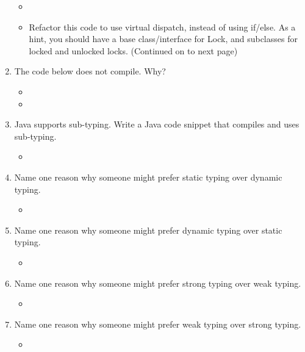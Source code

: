 \documentclass[12pt,a4paper]{article}
\begin{document}
\begin{enumerate}
\begin{itemize}
      \item[] 
      \item[] Refactor this code to use virtual dispatch, instead of using if/else. As a hint, you should have a
      base class/interface for Lock, and subclasses for locked and unlocked locks. (Continued on to
      next page) 
    \end{itemize}
    \clearpage
    \item The code below does not compile. Why? %
    \begin{itemize}
      \item[] 
      \item[] 
    \end{itemize}
    \clearpage
    \item Java supports sub-typing. Write a Java code snippet that compiles and uses sub-typing. %
    \begin{itemize}
      \item 
    \end{itemize} 
    \item Name one reason why someone might prefer static typing over dynamic typing. %
    \begin{itemize}
      \item 
    \end{itemize}
    \item Name one reason why someone might prefer dynamic typing over static typing. %
    \begin{itemize}
      \item 
    \end{itemize}
    \item Name one reason why someone might prefer strong typing over weak typing. %
    \begin{itemize}
      \item 
    \end{itemize}
    \item Name one reason why someone might prefer weak typing over strong typing. %
    \begin{itemize}
      \item 
    \end{itemize}
  \end{enumerate}
\end{document}
